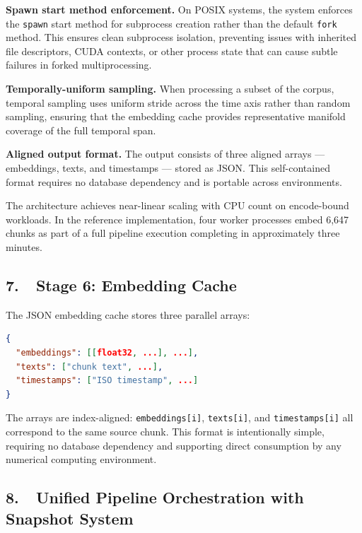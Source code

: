 \documentclass[12pt,letterpaper]{article}
\begin{document}
\textbf{Spawn start method enforcement.} On POSIX systems, the system enforces the
\texttt{spawn} start method for subprocess creation rather than the default \texttt{fork}
method. This ensures clean subprocess isolation, preventing issues with inherited file
descriptors, CUDA contexts, or other process state that can cause subtle failures in
forked multiprocessing.

\textbf{Temporally-uniform sampling.} When processing a subset of the corpus, temporal
sampling uses uniform stride across the time axis rather than random sampling, ensuring
that the embedding cache provides representative manifold coverage of the full temporal
span.

\textbf{Aligned output format.} The output consists of three aligned arrays ---
embeddings, texts, and timestamps --- stored as JSON. This self-contained format
requires no database dependency and is portable across environments.

The architecture achieves near-linear scaling with CPU count on encode-bound workloads.
In the reference implementation, four worker processes embed 6,647 chunks as part of a
full pipeline execution completing in approximately three minutes.

\subsection*{7.\ \ Stage 6: Embedding Cache}

The JSON embedding cache stores three parallel arrays:

\begin{lstlisting}[language=JSON, caption={Embedding cache JSON structure}]
{
  "embeddings": [[float32, ...], ...],
  "texts": ["chunk text", ...],
  "timestamps": ["ISO timestamp", ...]
}
\end{lstlisting}

The arrays are index-aligned: \texttt{embeddings[i]}, \texttt{texts[i]}, and
\texttt{timestamps[i]} all correspond to the same source chunk. This format is
intentionally simple, requiring no database dependency and supporting direct consumption
by any numerical computing environment.

\subsection*{8.\ \ Unified Pipeline Orchestration with Snapshot System}
\end{document}
